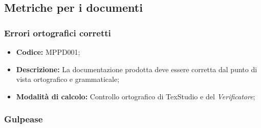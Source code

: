 \documentclass[../NormediProgetto.tex]{subfiles}
\begin{document}

\subsection{Metriche per i documenti}

\subsubsection{Errori ortografici corretti}

\begin{itemize}
	\item \textbf{Codice:} MPPD001;
	\item \textbf{Descrizione:} La documentazione prodotta deve essere corretta dal punto di vista ortografico e grammaticale;
	\item \textbf{Modalità di calcolo:} Controllo ortografico di TexStudio e del \textit{Verificatore};
\end{itemize}

\subsubsection{Gulpease}
\end{document}
